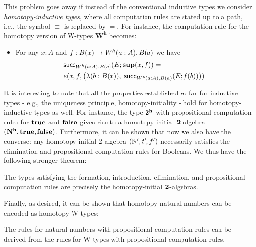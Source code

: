 This problem goes away if instead of the conventional inductive types we consider \emph{homotopy-inductive types}, where all computation rules are stated up to a path, i.e., the symbol $\equiv$ is replaced by $=$. For instance, the computation rule for the homotopy version of W-types $\mathbf{W^h}$ becomes:
\begin{itemize}
\item For any $x : A$ and $f : B(x) \to W^h(a:A), B(a)$ we have 
\begin{align*}
& \mathsf{succ}_{W^h(a:A), B(a)}(E;\mathbf{sup}(x,f)) = \\ & e(x,f,\big(\lambda (b : B(x)), \; \mathsf{succ}_{W^h(a:A), B(a)}(E;f(b))\big))
\end{align*}
\end{itemize}

It is interesting to note that all the properties established so far for inductive types - e.g., the uniqueness principle, homotopy-initiality - hold for homotopy-inductive types as well. For instance, the type $\mathbf{2^h}$ with propositional computation rules for $\mathbf{true}$ and $\mathbf{false}$ gives rise to a homotopy-initial $\mathbf{2}$-algebra $(\mathbf{N^h}, \mathbf{true}, \mathbf{false})$. Furthermore, it can be shown that now we also have the converse: any homotopy-initial $2$-algebra $(\mathbb{N}',t',f')$ necessarily satisfies the elimination and propositional computation rules for Booleans. We thus have the following stronger theorem:

\begin{thm}
The types satisfying the formation, introduction, elimination, and propositional computation rules are precisely the homotopy-initial $\mathbf{2}$-algebras.
\end{thm}

Finally, as desired, it can be shown that homotopy-natural numbers can be encoded as homotopy-W-types:

\begin{thm}
The rules for natural numbers with propositional computation rules can be derived from the rules for W-types with propositional computation rules.
\end{thm}

